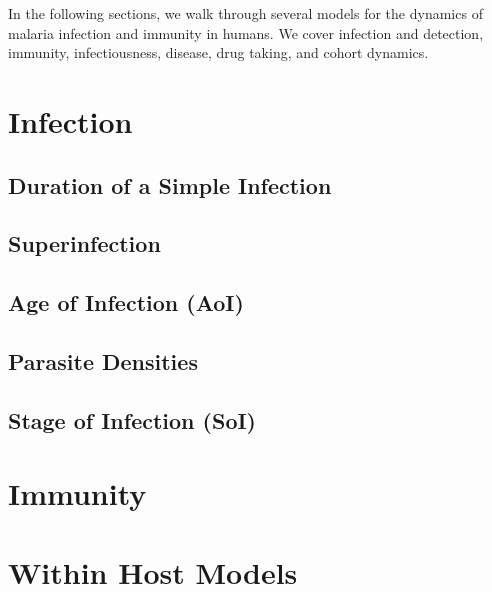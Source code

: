 \documentclass[
]{book}
\begin{document}
In the following sections, we walk through several models for the dynamics of malaria infection and immunity in humans. We cover infection and detection, immunity, infectiousness, disease, drug taking, and cohort dynamics.

\hypertarget{infection}{%
\section{Infection}\label{infection}}

\hypertarget{duration-of-a-simple-infection}{%
\subsection{Duration of a Simple Infection}\label{duration-of-a-simple-infection}}

\hypertarget{superinfection-1}{%
\subsection{Superinfection}\label{superinfection-1}}

\hypertarget{age-of-infection-aoi}{%
\subsection{Age of Infection (AoI)}\label{age-of-infection-aoi}}

\hypertarget{parasite-densities}{%
\subsection{Parasite Densities}\label{parasite-densities}}

\hypertarget{stage-of-infection-soi}{%
\subsection{Stage of Infection (SoI)}\label{stage-of-infection-soi}}

\hypertarget{immunity}{%
\section{Immunity}\label{immunity}}

\hypertarget{within-host-models}{%
\section{Within Host Models}\label{within-host-models}}
\end{document}
